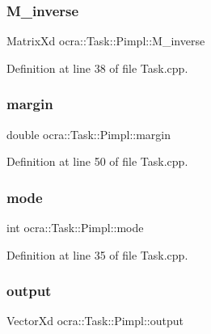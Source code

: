 \subsubsection{\texorpdfstring{M\+\_\+inverse}{M\_inverse}}
{\footnotesize\ttfamily Matrix\+Xd ocra\+::\+Task\+::\+Pimpl\+::\+M\+\_\+inverse}



Definition at line 38 of file Task.\+cpp.

\hypertarget{structocra_1_1Task_1_1Pimpl_a8e92bd559918e4b01bcd235ad9e40a3a}{}\label{structocra_1_1Task_1_1Pimpl_a8e92bd559918e4b01bcd235ad9e40a3a} 
\subsubsection{\texorpdfstring{margin}{margin}}
{\footnotesize\ttfamily double ocra\+::\+Task\+::\+Pimpl\+::margin}



Definition at line 50 of file Task.\+cpp.

\hypertarget{structocra_1_1Task_1_1Pimpl_a634149661255498ea67c10750174ec62}{}\label{structocra_1_1Task_1_1Pimpl_a634149661255498ea67c10750174ec62} 
\subsubsection{\texorpdfstring{mode}{mode}}
{\footnotesize\ttfamily int ocra\+::\+Task\+::\+Pimpl\+::mode}



Definition at line 35 of file Task.\+cpp.

\hypertarget{structocra_1_1Task_1_1Pimpl_a744ec0ed0ff3032105be593b86e7eb61}{}\label{structocra_1_1Task_1_1Pimpl_a744ec0ed0ff3032105be593b86e7eb61} 
\subsubsection{\texorpdfstring{output}{output}}
{\footnotesize\ttfamily Vector\+Xd ocra\+::\+Task\+::\+Pimpl\+::output}



